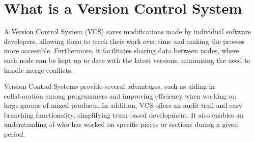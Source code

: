 %
%
%
%
%
%
\section{What is a Version Control System}
A Version Control System (VCS) saves modifications made by individual software developers, allowing them to track their work over time and making the process more accessible. Furthermore, it facilitates sharing data between nodes, where each node can be kept up to date with the latest versions, minimising the need to handle merge conflicts.

Version Control Systems provide several advantages, such as aiding in collaboration among programmers and improving efficiency when working on large groups of mixed products. In addition, VCS offers an audit trail and easy branching functionality, simplifying team-based development. It also enables an understanding of who has worked on specific pieces or sections during a given period.

